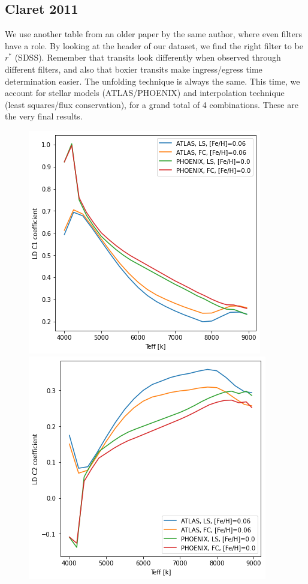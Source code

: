 \documentclass[a4paper,11pt,twocolumn]{article}
\begin{document}
\subsection{Claret 2011}
We use another table from an older paper by the same author, where even 
filters have a role. By looking at the header of our dataset, we find the 
right filter to be $r^{*}$ (SDSS). Remember that transits look differently 
when observed through different filters, and also that boxier transits make 
ingress/egress time determination easier. The unfolding technique is always 
the same.
This time, we account for stellar models (ATLAS/PHOENIX) and interpolation 
technique (least squares/flux conservation), for a grand total of 4 
combinations. These are the very final results.
\begin{figure}[H]
    \centering  
    \includegraphics[scale=0.5, angle=0]{../pictures/Claret2011/c1.png}
    \includegraphics[scale=0.5, angle=0]{../pictures/Claret2011/c2.png}

\end{figure}
\end{document}
